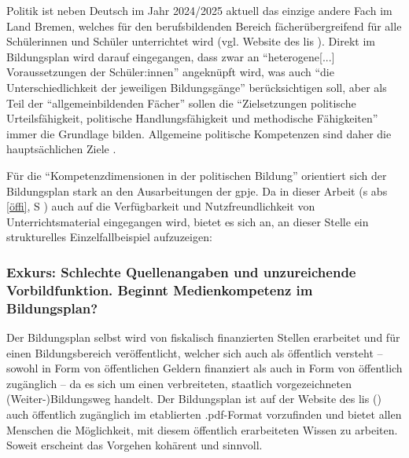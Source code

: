 Politik ist neben Deutsch im Jahr 2024/2025 aktuell das einzige andere Fach im Land Bremen, welches für den berufsbildenden Bereich fächerübergreifend für alle Schülerinnen und Schüler unterrichtet wird (vgl. Website des \gls{lis} \citeyear{LisBildungspläne}). Direkt im Bildungsplan \autocite[][4]{bplan} wird darauf eingegangen, dass zwar an \enquote{heterogene[...] Voraussetzungen der Schüler:innen} angeknüpft wird, was auch \enquote{die Unterschiedlichkeit der jeweiligen Bildungsgänge} berücksichtigen soll, aber als Teil der \enquote{allgemeinbildenden Fächer} sollen die \enquote{Zielsetzungen politische Urteilsfähigkeit, politische Handlungsfähigkeit und methodische Fähigkeiten} immer die Grundlage bilden. Allgemeine politische Kompetenzen sind daher die hauptsächlichen Ziele \autocite[9-13]{bplan}.

Für die \enquote{Kompetenzdimensionen in der politischen Bildung} orientiert sich der Bildungsplan stark an den Ausarbeitungen der \gls{gpje}.
Da in dieser Arbeit (\gls{s} \gls{abs} \ref{öffi}, \gls{S} \pageref{öffi}) auch auf die Verfügbarkeit und Nutzfreundlichkeit von Unterrichtsmaterial eingegangen wird, bietet es sich an, an dieser Stelle ein strukturelles Einzelfallbeispiel aufzuzeigen:

\subsubsection{Exkurs: Schlechte Quellenangaben und unzureichende Vorbildfunktion. Beginnt Medienkompetenz im Bildungsplan? \label{gpje}}
Der Bildungsplan selbst wird von fiskalisch finanzierten Stellen erarbeitet und für einen Bildungsbereich veröffentlicht, welcher sich auch als öffentlich versteht -- sowohl in Form von öffentlichen Geldern finanziert als auch in Form von öffentlich zugänglich -- da es sich um einen verbreiteten, staatlich vorgezeichneten \mbox{(Weiter-)Bildungsweg} %
handelt. Der Bildungsplan ist auf der Website des \gls{lis} (\citeyear[]{LisBildungspläne}) auch öffentlich zugänglich im etablierten .pdf-Format vorzufinden und bietet allen Menschen die Möglichkeit, mit diesem öffentlich erarbeiteten Wissen zu arbeiten.
Soweit erscheint das Vorgehen kohärent und sinnvoll.

